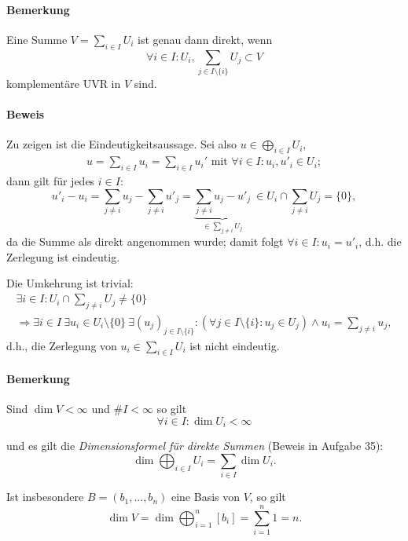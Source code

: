 \paragraph{Bemerkung}
	Eine Summe $ V = \sum_{i\in I} U_i $ ist genau dann direkt, wenn
		\[
		\forall i\in I: U_i, \sum_{j\in I\setminus\{i\}}U_j \subset V
		\]
	komplementäre UVR in $ V $ sind.

\paragraph{Beweis}
	Zu zeigen ist die Eindeutigkeitsaussage. Sei also $ u \in \bigoplus_{i\in I}U_i $,
		\begin{gather*}
		u = \sum_{i\in I} u_i = \sum_{i\in I} u_i' \text{ mit } \forall i\in I: u_i,u'_i\in U_i;
		\end{gather*}
	dann gilt für jedes $ i\in I$:
		\[
		u'_i-u_i = \sum _{j\neq i}u_j-\sum_{j\neq i} u'_j = \underbrace{\sum_{j\neq i}u_j-u'_j}_{\in \sum_{j\neq i}U_j}\ \in U_i\cap \sum_{j\neq i} U_j = \{0\},
		\]
	da die Summe als direkt angenommen wurde; damit folgt $ \forall i \in I: u_i = u'_i $, d.h. die Zerlegung ist eindeutig.
	
	Die Umkehrung ist trivial:
		\begin{gather*}
		\exists i\in I:U_i\cap \sum_{j\neq i} U_j \neq \{0\}\\
		\Rightarrow \exists i\in I\ \exists u_i\in U_i\setminus\{0\}\ \exists (u_j)_{j\in I\setminus\{i\}}:
		(\forall j\in I\setminus\{i\}:u_j \in U_j)\land u_i = \sum_{j\neq i} u_j,
		\end{gather*}
	d.h., die Zerlegung von $ u_i\in \sum_{i\in I}U_i $ ist nicht eindeutig.

\paragraph{Bemerkung}
	Sind $ \dim V <\infty $ und $ \# I < \infty $ so gilt
		\begin{equation*}
		\forall i\in I: \dim U_i < \infty
		\end{equation*}
		
	und es gilt die \emph{Dimensionsformel für direkte Summen} (Beweis in Aufgabe 35):
		\begin{equation*}
		\dim \bigoplus_{i\in I}U_i = \sum_{i\in I} \dim U_i.
		\end{equation*}
	
	Ist insbesondere $ B=(b_1,...,b_n) $ eine Basis von $ V $, so gilt
		\begin{equation*}
		\dim V = \dim \bigoplus_{i=1}^n [b_i]=\sum_{i=1}^{n}1 = n.
		\end{equation*}
		
